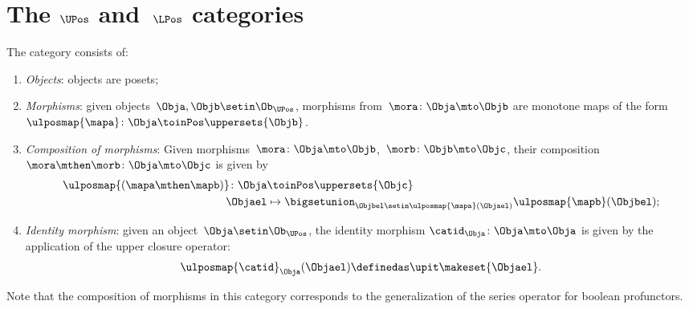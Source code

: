 \section{The $\UPos$ and~$\LPos$ categories}

\begin{definition}
    \label{def:upos_cat}
    The category \UPos consists of:
    \begin{enumerate}
        \item \emph{Objects}: objects are posets;
        \item \emph{Morphisms}: given objects~$\Obja,\Objb\setin \Ob_{\UPos}$, morphisms from~$\mora\colon \Obja \mto \Objb$ are monotone maps of the form~$\ulposmap{\mapa} \colon \Obja \toinPos \uppersets{\Objb}$.
        \item \emph{Composition of morphisms}: Given morphisms~$\mora\colon \Obja \mto \Objb$,~$\morb\colon \Objb\mto \Objc$, their composition~$\mora\mthen \morb\colon \Obja\mto \Objc$ is given by
              \begin{equation}
                  \begin{aligned}
                      \ulposmap{(\mapa \mthen \mapb)} \colon \Obja & \toinPos \uppersets{\Objc} \\
                      \Objael                                      & \mapsto \bigsetunion_{\Objbel\setin \ulposmap{\mapa}(\Objael)}\ulposmap{\mapb}(\Objbel);
                  \end{aligned}
              \end{equation}
        \item \emph{Identity morphism}: given an object~$\Obja\setin \Ob_{\UPos}$, the identity morphism $\catid_\Obja \colon \Obja \mto \Obja$ is given by the application of the upper closure operator:
              \begin{equation}
                  \ulposmap{\catid}_\Obja(\Objael)\definedas \upit\makeset{\Objael}.
              \end{equation}
    \end{enumerate}
\end{definition}

\begin{remark}
    Note that the composition of morphisms in this category corresponds to the generalization of the series operator for boolean profunctors.
\end{remark}

